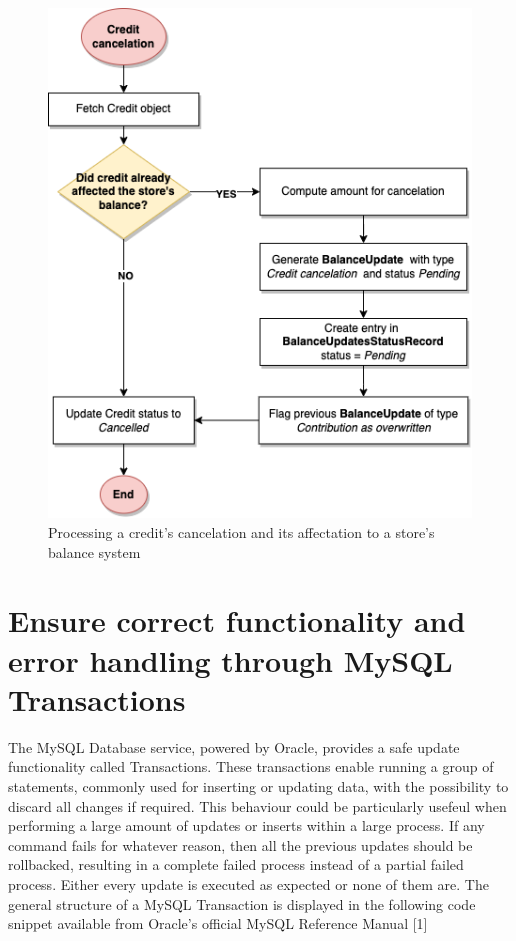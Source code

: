\begin{figure} [H]
    \centering
    \includegraphics[scale = 0.6]{assets/flowcharts/CreditCancelation.png}
    \caption{Processing a credit's cancelation and its affectation to a store's balance system}\label{fig:dlowchart_credit_cancelation}
\end{figure}

\section{Ensure correct functionality and error handling through MySQL Transactions}

The MySQL Database service, powered by Oracle, provides a safe update functionality called Transactions. These transactions enable running a group of statements, commonly used for inserting or updating data, with the possibility to discard all changes if required. This behaviour could be particularly usefeul when performing a large amount of updates or inserts within a large process. If any command fails for whatever reason, then all the previous updates should be rollbacked, resulting in a complete failed process instead of a partial failed process. Either every update is executed as expected or none of them are. The general structure of a MySQL Transaction is displayed in the following code snippet available from Oracle's official MySQL Reference Manual [1]

